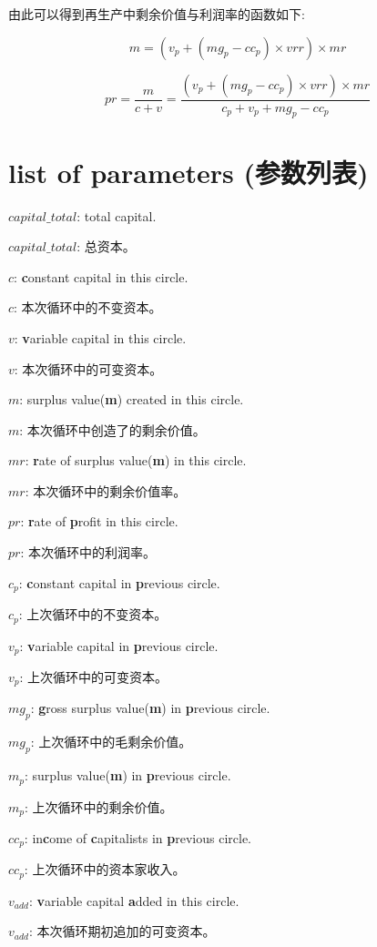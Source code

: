 \documentclass[]{ctexart}
\begin{document}
由此可以得到再生产中剩余价值与利润率的函数如下:

$$m = (v_p + (mg_p - cc_p) \times vrr) \times mr$$

$$pr = \frac{m}{c + v} = \frac{(v_p + (mg_p - cc_p) \times vrr) \times mr}{c_p + v_p + mg_p - cc_p}$$

\section{list of parameters (参数列表)}

$capital\_total$: total capital.

$capital\_total$: 总资本。

$c$: \textbf{c}onstant capital in this circle.

$c$: 本次循环中的不变资本。

$v$: \textbf{v}ariable capital in this circle.

$v$: 本次循环中的可变资本。

$m$: surplus value(\textbf{m}) created in this circle.

$m$: 本次循环中创造了的剩余价值。

$mr$: \textbf{r}ate of surplus value(\textbf{m}) in this circle.

$mr$: 本次循环中的剩余价值率。

$pr$: \textbf{r}ate of \textbf{p}rofit in this circle.

$pr$: 本次循环中的利润率。

$c_p$: \textbf{c}onstant capital in \textbf{p}revious circle.

$c_p$: 上次循环中的不变资本。

$v_p$: \textbf{v}ariable capital in \textbf{p}revious circle.

$v_p$: 上次循环中的可变资本。

$mg_p$: \textbf{g}ross surplus value(\textbf{m}) in \textbf{p}revious circle.

$mg_p$: 上次循环中的毛剩余价值。

$m_p$: surplus value(\textbf{m}) in \textbf{p}revious circle.

$m_p$: 上次循环中的剩余价值。

$cc_p$: in\textbf{c}ome of \textbf{c}apitalists in \textbf{p}revious circle.

$cc_p$: 上次循环中的资本家收入。

$v_{add}$: \textbf{v}ariable capital \textbf{a}dded in this circle.

$v_{add}$: 本次循环期初追加的可变资本。
\end{document}
